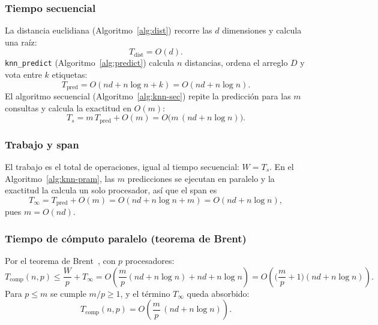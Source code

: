 \documentclass[11pt,a4paper]{article}
\newcommand{\Tcomp}{T_{\text{comp}}}
\begin{document}
\subsubsection{Tiempo secuencial}
La distancia euclidiana (Algoritmo~\ref{alg:dist}) recorre las $d$ dimensiones y calcula una raíz:
\begin{equation}
  T_{\text{dist}}=O(d).\label{eq:tdist}
\end{equation}
\texttt{knn\_predict} (Algoritmo~\ref{alg:predict}) calcula $n$ distancias, ordena el arreglo $D$ y
vota entre $k$ etiquetas:
\begin{equation}
  T_{\text{pred}}=O(nd+n\log n+k)=O(nd+n\log n).\label{eq:tpred}
\end{equation}
El algoritmo secuencial (Algoritmo~\ref{alg:knn-sec}) repite la predicción para las $m$ consultas y
calcula la exactitud en $O(m)$:
\begin{equation}
  T_s=m\,T_{\text{pred}}+O(m)=O\big(m\,(nd+n\log n)\big).\label{eq:ts}
\end{equation}

\subsubsection{Trabajo y span}
El trabajo es el total de operaciones, igual al tiempo secuencial: $W=T_s$. En el
Algoritmo~\ref{alg:knn-pram}, las $m$ predicciones se ejecutan en paralelo y la exactitud la calcula
un solo procesador, así que el span es
\begin{equation}
  T_\infty=T_{\text{pred}}+O(m)=O(nd+n\log n+m)=O(nd+n\log n),\label{eq:span}
\end{equation}
pues $m=O(nd)$.

\subsubsection{Tiempo de cómputo paralelo (teorema de Brent)}
Por el teorema de Brent~\cite{brent1974}, con $p$ procesadores:
\begin{equation}
  \Tcomp(n,p)\le\frac{W}{p}+T_\infty
  =O\!\left(\frac{m}{p}(nd+n\log n)+nd+n\log n\right)
  =O\!\left(\Big(\frac{m}{p}+1\Big)(nd+n\log n)\right).\label{eq:brent}
\end{equation}
Para $p\le m$ se cumple $m/p\ge1$, y el término $T_\infty$ queda absorbido:
\begin{equation}
  \Tcomp(n,p)=O\!\left(\frac{m}{p}\,(nd+n\log n)\right).\label{eq:tcomp}
\end{equation}
\end{document}
